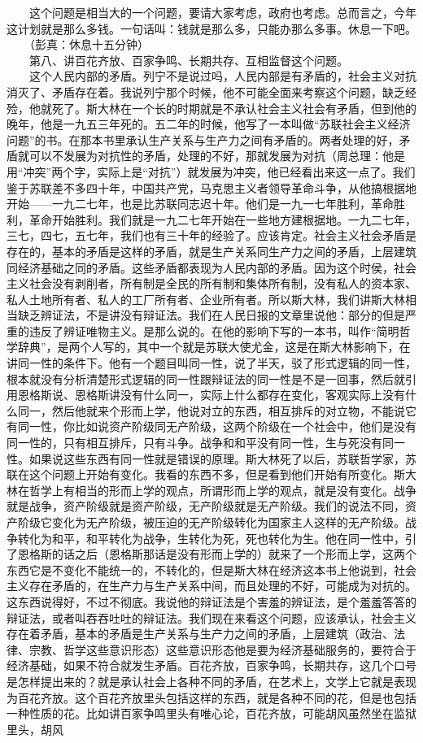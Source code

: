 \documentclass[cn,11pt,chinese]{elegantbook}
\begin{document}
　　这个问题是相当大的一个问题，要请大家考虑，政府也考虑。总而言之，今年这计划就是那么多钱。一句话叫：钱就是那么多，只能办那么多事。休息一下吧。\\
　　（彭真：休息十五分钟）\\
　　第八、讲百花齐放、百家争鸣、长期共存、互相监督这个问题。\\
　　这个人民内部的矛盾。列宁不是说过吗，人民内部是有矛盾的，社会主义对抗消灭了、矛盾存在着。我说列宁那个时候，他不可能全面来考察这个问题，缺乏经殓，他就死了。斯大林在一个长的时期就是不承认社会主义社会有矛盾，但到他的晚年，他是一九五三年死的。五二年的时候，他写了一本叫做“苏联社会主义经济问题”的书。在那本书里承认生产关系与生产力之间有矛盾的。两者处理的好，矛盾就可以不发展为对抗性的矛盾，处理的不好，那就发展为对抗（周总理：他是用“冲突”两个字，实际上是“对抗”）就发展为冲突，他已经看出来这一点了。我们鉴于苏联差不多四十年，中国共产党，马克思主义者领导革命斗争，从他搞根据地开始——一九二七年，也是比苏联同志迟十年。他们是一九一七年胜利，革命胜利，革命开始胜利。我们就是一九二七年开始在一些地方建根据地。一九二七年，三七，四七，五七年，我们也有三十年的经验了。应该肯定。社会主义社会矛盾是存在的，基本的矛盾是这样的矛盾，就是生产关系同生产力之间的矛盾，上层建筑同经济基础之同的矛盾。这些矛盾都表现为人民内部的矛盾。因为这个时侯，社会主义社会没有剥削者，所有制是全民的所有制和集体所有制，没有私人的资本家、私人土地所有者、私人的工厂所有者、企业所有者。所以斯大林，我们讲斯大林相当缺乏辨证法，不是讲没有辩证法。我们在人民日报的文章里说他：部分的但是严重的违反了辨证唯物主义。是那么说的。在他的影响下写的一本书，叫作“简明哲学辞典”，是两个人写的，其中一个就是苏联大使尤金，这是在斯大林影响下，在讲同一性的条件下。他有一个题目叫同一性，说了半天，驳了形式逻辑的同一性，根本就没有分析清楚形式逻辑的同一性跟辩证法的同一性是不是一回事，然后就引用恩格斯说、恩格斯讲没有什么同一，实际上什么都存在变化，客观实际上没有什么同一，然后他就来个形而上学，他说对立的东西，相互排斥的对立物，不能说它有同一性，你比如说资产阶级同无产阶级，这两个阶级在一个社会中，他们是没有同一性的，只有相互排斥，只有斗争。战争和和平没有同一性，生与死没有同一性。如果说这些东西有同一性就是错误的原理。斯大林死了以后，苏联哲学家，苏联在这个问题上开始有变化。我看的东西不多，但是看到他们开始有所变化。斯大林在哲学上有相当的形而上学的观点，所谓形而上学的观点，就是没有变化。战争就是战争，资产阶级就是资产阶级，无产阶级就是无产阶级。我们的说法不同，资产阶级它变化为无产阶级，被压迫的无产阶级转化为国家主人这样的无产阶级。战争转化为和平，和平转化为战争，生转化为死，死也转化为生。他在同一性中，引了恩格斯的话之后（恩格斯那话是没有形而上学的）就来了一个形而上学，这两个东西它是不变化不能统一的，不转化的，但是斯大林在经济这本书上他说到，社会主义存在矛盾的，在生产力与生产关系中间，而且处理的不好，可能成为对抗的。这东西说得好，不过不彻底。我说他的辩证法是个害羞的辨证法，是个羞羞答答的辩证法，或者叫吞吞吐吐的辩证法。我们现在来看这个问题，应该承认，社会主义存在着矛盾，基本的矛盾是生产关系与生产力之间的矛盾，上层建筑（政治、法律、宗教、哲学这些意识形态）这些意识形态他是要为经济基础服务的，要符合于经济基础，如果不符合就发生矛盾。百花齐放，百家争鸣，长期共存，这几个口号是怎样提出来的？就是承认社会上各种不同的矛盾，在艺术上，文学上它就是表现为百花齐放。这个百花齐放里头包括这样的东西，就是各种不同的花，但是也包括一种性质的花。比如讲百家争鸣里头有唯心论，百花齐放，可能胡风虽然坐在监狱里头，胡风
\end{document}
